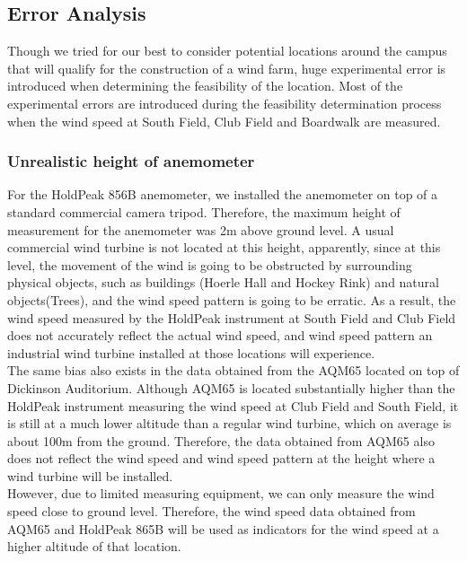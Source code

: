 \documentclass[review]{elsarticle}
\begin{document}
\subsection{Error Analysis}
\label{sec:analysis:erroranalysis}

Though we tried for our best to consider potential locations around the campus that will qualify for the construction of a wind farm, huge experimental 
error is introduced when determining the feasibility of the location. Most of the experimental errors are introduced during the feasibility determination 
process when the wind speed at South Field, Club Field and Boardwalk are measured.

\subsubsection{Unrealistic height of anemometer}
\label{sec:analysis:erroranalysis:unrealisticheight}
For the HoldPeak 856B anemometer, we installed the anemometer on top of a standard commercial camera tripod. Therefore, the maximum height of measurement 
for the anemometer was 2m above ground level. A usual commercial wind turbine is not located at this height, apparently, since at this level, the movement 
of the wind is going to be obstructed by surrounding physical objects, such as buildings (Hoerle Hall and Hockey Rink) and natural objects(Trees), and the 
wind speed pattern is going to be erratic. As a result, the wind speed measured by the HoldPeak instrument at South Field and Club Field does not accurately 
reflect the actual wind speed, and wind speed pattern an industrial wind turbine installed at those locations will experience. 
\\\indent The same bias also exists in the data obtained from the AQM65 located on top of Dickinson Auditorium. Although AQM65 is located substantially 
higher than the HoldPeak instrument measuring the wind speed at Club Field and South Field, it is still at a much lower altitude than a regular wind turbine, 
which on average is about 100m from the ground. Therefore, the data obtained from AQM65 also does not reflect the wind speed and wind speed pattern at the 
height where a wind turbine will be installed. 
\\\indent However, due to limited measuring equipment, we can only measure the wind speed close to ground level. Therefore, the wind speed data obtained 
from AQM65 and HoldPeak 865B will be used as indicators for the wind speed at a higher altitude of that location.
\end{document}
